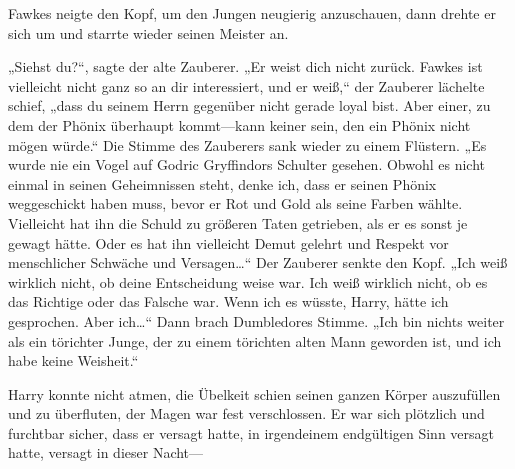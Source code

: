Fawkes neigte den Kopf, um den Jungen neugierig anzuschauen, dann drehte er sich um und starrte wieder seinen Meister an.

„Siehst du?“, sagte der alte Zauberer. „Er weist dich nicht zurück. Fawkes ist vielleicht nicht ganz so an dir interessiert, und er weiß,“ der Zauberer lächelte schief, „dass du seinem Herrn gegenüber nicht gerade loyal bist. Aber einer, zu dem der Phönix überhaupt kommt—kann keiner sein, den ein Phönix nicht mögen würde.“
Die Stimme des Zauberers sank wieder zu einem Flüstern.
„Es wurde nie ein Vogel auf Godric Gryffindors Schulter gesehen. Obwohl es nicht einmal in seinen Geheimnissen steht, denke ich, dass er seinen Phönix weggeschickt haben muss, bevor er Rot und Gold als seine Farben wählte. Vielleicht hat ihn die Schuld zu größeren Taten getrieben, als er es sonst je gewagt hätte. Oder es hat ihn vielleicht Demut gelehrt und Respekt vor menschlicher Schwäche und Versagen…“ Der Zauberer senkte den Kopf.
„Ich weiß wirklich nicht, ob deine Entscheidung weise war. Ich weiß wirklich nicht, ob es das Richtige oder das Falsche war. Wenn ich es wüsste, Harry, hätte ich gesprochen. Aber ich…“ Dann brach Dumbledores Stimme. „Ich bin nichts weiter als ein törichter Junge, der zu einem törichten alten Mann geworden ist, und ich habe keine Weisheit.“

Harry konnte nicht atmen, die Übelkeit schien seinen ganzen Körper auszufüllen und zu überfluten, der Magen war fest verschlossen. Er war sich plötzlich und furchtbar sicher, dass er versagt hatte, in irgendeinem endgültigen Sinn versagt hatte, versagt in dieser Nacht—

